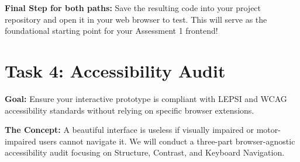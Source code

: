 \documentclass[a4paper,12pt]{article}
\begin{document}
\textbf{Final Step for both paths:} Save the resulting code into your project repository and open it in your web browser to test. This will serve as the foundational starting point for your Assessment 1 frontend!


\section*{Task 4: Accessibility Audit}

\textbf{Goal:} Ensure your interactive prototype is compliant with LEPSI and WCAG accessibility standards without relying on specific browser extensions.

\textbf{The Concept:} A beautiful interface is useless if visually impaired or motor-impaired users cannot navigate it. We will conduct a three-part browser-agnostic accessibility audit focusing on Structure, Contrast, and Keyboard Navigation.
\end{document}
